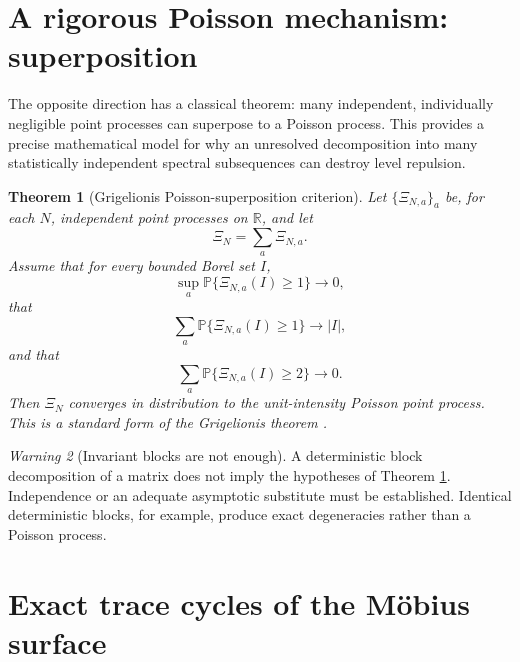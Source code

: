 \documentclass[11pt]{amsart}
\numberwithin{equation}{section}
\theoremstyle{plain}
\newtheorem{theorem}{Theorem}[section]
\theoremstyle{definition}
\theoremstyle{remark}
\newtheorem{warning}[theorem]{Warning}
\begin{document}
\section{A rigorous Poisson mechanism: superposition}
\label{sec:poisson_superposition}

The opposite direction has a classical theorem: many independent, individually negligible point processes can superpose to a Poisson process.  This provides a precise mathematical model for why an unresolved decomposition into many statistically independent spectral subsequences can destroy level repulsion.

\begin{theorem}[Grigelionis Poisson-superposition criterion]
\label{thm:grigelionis}
Let $\{\Xi_{N,a}\}_a$ be, for each $N$, independent point processes on $\mathbb R$, and let
\begin{equation}
\Xi_N=\sum_a\Xi_{N,a}.
\label{eq:point_superposition}
\end{equation}
Assume that for every bounded Borel set $I$,
\begin{equation}
\sup_a\mathbb P\{\Xi_{N,a}(I)\ge1\}\longrightarrow0,
\label{eq:grigelionis_null}
\end{equation}
that
\begin{equation}
\sum_a\mathbb P\{\Xi_{N,a}(I)\ge1\}\longrightarrow |I|,
\label{eq:grigelionis_intensity}
\end{equation}
and that
\begin{equation}
\sum_a\mathbb P\{\Xi_{N,a}(I)\ge2\}\longrightarrow0.
\label{eq:grigelionis_double}
\end{equation}
Then $\Xi_N$ converges in distribution to the unit-intensity Poisson point process.  This is a standard form of the Grigelionis theorem \cite{Grigelionis1963}.
\end{theorem}

\begin{warning}[Invariant blocks are not enough]
\label{warn:blocks_not_enough}
A deterministic block decomposition of a matrix does not imply the hypotheses of Theorem \ref{thm:grigelionis}.  Independence or an adequate asymptotic substitute must be established.  Identical deterministic blocks, for example, produce exact degeneracies rather than a Poisson process.
\end{warning}

\section{Exact trace cycles of the M\"obius surface}
\label{sec:trace_cycles}
\end{document}
